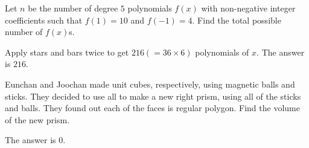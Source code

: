 \begin{problem}
Let $n$ be the number of degree $5$ polynomials $f(x)$ with non-negative integer coefficients such that $f(1)=10$ and $f(-1)=4$. Find the total possible number of $f(x)$s.
\end{problem}

\begin{solution}
Apply stars and bars twice to get $216(=36\times6)$ polynomials of $x$. The answer is $216$.
\end{solution}

\begin{problem}
Eunchan and Joochan made unit cubes, respectively, using magnetic balls and sticks. They decided to use all to make a new right prism, using all of the sticks and balls. They found out each of the faces is regular polygon. Find the volume of the new prism.
\end{problem}

\begin{solution}
The answer is $0$.
\end{solution}